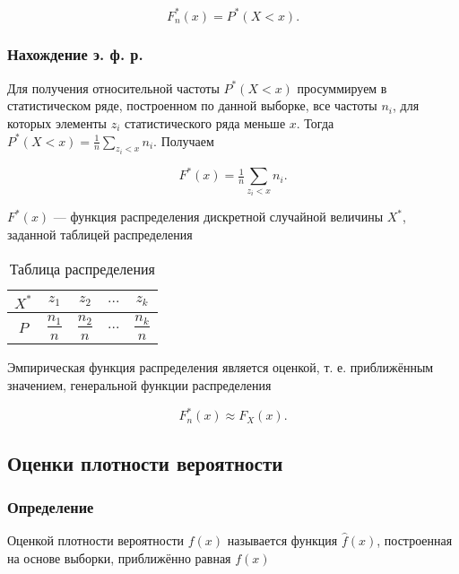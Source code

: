 \documentclass{article}
\begin{document}
\begin{equation}
    F_n^*(x) = P^*(X < x).
\end{equation}

\subsubsection{Нахождение э. ф. р.}

Для получения относительной частоты $P^*(X < x)$ просуммируем в статистическом ряде, построенном по данной выборке, все частоты $n_i$, для которых элементы $z_i$ статистического ряда меньше $x$. Тогда $P^*(X < x) = \tfrac{1}{n}\sum\limits_{z_i < x}n_i$. Получаем

\begin{equation}
    F^*(x) = \tfrac{1}{n}\sum\limits_{z_i < x}n_i.
\end{equation}

$F^*(x)$ --- функция распределения дискретной случайной величины $X^*$, заданной таблицей распределения

\begin{table}[h!]
\begin{center}
\begin{tabular}{|c|c|c|c|c|}
\hline
$X^*$ & $z_1$ & $z_2$ & $...$ & $z_k$ \\
\hline
$P$ & $\dfrac{n_1}{n}$ & $\dfrac{n_2}{n}$ & $...$ & $\dfrac{n_k}{n}$ \\
\hline
\end{tabular}
\end{center}
\caption{Таблица распределения}
\end{table}

Эмпирическая функция распределения является оценкой, т. е. приближённым значением, генеральной функции распределения

\begin{equation}
    F_n^*(x) \approx F_X(x).
\end{equation}

\subsection{Оценки плотности вероятности}

\subsubsection{Определение}
Оценкой плотности вероятности $f(x)$ называется функция $\widehat{f}(x)$, построенная на основе выборки, приближённо равная $f(x)$
\end{document}
